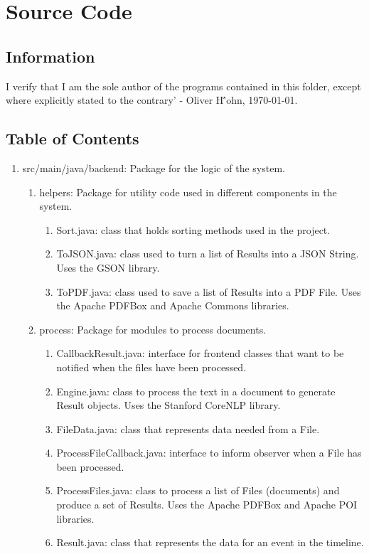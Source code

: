 \chapter{Source Code}
\section{Information}
I verify that I am the sole author of the programs contained in this folder, except where explicitly stated to the contrary' - Oliver H\''ohn, \today.
\section{Table of Contents}
\begin{enumerate}
	\item src/main/java/backend: Package for the logic of the system.
		\begin{enumerate}
			\item helpers: Package for utility code used in different components in the system.
			\begin{enumerate}
				\item Sort.java: class that holds sorting methods used in the project.
				\item ToJSON.java: class used to turn a list of Results into a JSON String. Uses the GSON library.
				\item ToPDF.java: class used to save a list of Results into a PDF File. Uses the Apache PDFBox and Apache Commons libraries.
			\end{enumerate}
			\item process: Package for modules to process documents.
			\begin{enumerate}
				\item CallbackResult.java: interface for frontend classes that want to be notified when the files have been processed.
				\item Engine.java: class to process the text in a document to generate Result objects. Uses the Stanford CoreNLP library.
				\item FileData.java: class that represents data needed from a File.
				\item ProcessFileCallback.java: interface to inform observer when a File has been processed.
				\item ProcessFiles.java: class to process a list of Files (documents) and produce a set of Results. Uses the Apache PDFBox and Apache POI libraries.
				\item Result.java: class that represents the data for an event in the timeline.

\end{enumerate}
\end{enumerate}
\end{enumerate}
